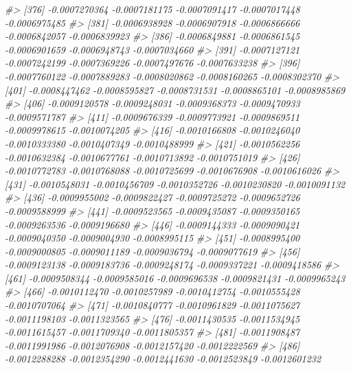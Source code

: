 \documentclass[
]{article}
\newenvironment{Shaded}{\begin{snugshade}}{\end{snugshade}}
\newcommand{\CommentTok}[1]{\textcolor[rgb]{0.56,0.35,0.01}{\textit{#1}}}
\begin{document}
\begin{Shaded}
\begin{Highlighting}[]
\CommentTok{\#\textgreater{} [376] {-}0.0007270364 {-}0.0007181175 {-}0.0007091417 {-}0.0007017448 {-}0.0006975485}
\CommentTok{\#\textgreater{} [381] {-}0.0006938928 {-}0.0006907918 {-}0.0006866666 {-}0.0006842057 {-}0.0006839923}
\CommentTok{\#\textgreater{} [386] {-}0.0006849881 {-}0.0006861545 {-}0.0006901659 {-}0.0006948743 {-}0.0007034660}
\CommentTok{\#\textgreater{} [391] {-}0.0007127121 {-}0.0007242199 {-}0.0007369226 {-}0.0007497676 {-}0.0007633238}
\CommentTok{\#\textgreater{} [396] {-}0.0007760122 {-}0.0007889283 {-}0.0008020862 {-}0.0008160265 {-}0.0008302370}
\CommentTok{\#\textgreater{} [401] {-}0.0008447462 {-}0.0008595827 {-}0.0008731531 {-}0.0008865101 {-}0.0008985869}
\CommentTok{\#\textgreater{} [406] {-}0.0009120578 {-}0.0009248031 {-}0.0009368373 {-}0.0009470933 {-}0.0009571787}
\CommentTok{\#\textgreater{} [411] {-}0.0009676339 {-}0.0009773921 {-}0.0009869511 {-}0.0009978615 {-}0.0010074205}
\CommentTok{\#\textgreater{} [416] {-}0.0010166808 {-}0.0010246040 {-}0.0010333380 {-}0.0010407349 {-}0.0010488999}
\CommentTok{\#\textgreater{} [421] {-}0.0010562256 {-}0.0010632384 {-}0.0010677761 {-}0.0010713892 {-}0.0010751019}
\CommentTok{\#\textgreater{} [426] {-}0.0010772783 {-}0.0010768088 {-}0.0010725699 {-}0.0010676908 {-}0.0010616026}
\CommentTok{\#\textgreater{} [431] {-}0.0010548031 {-}0.0010456709 {-}0.0010352726 {-}0.0010230820 {-}0.0010091132}
\CommentTok{\#\textgreater{} [436] {-}0.0009955002 {-}0.0009822427 {-}0.0009725272 {-}0.0009652726 {-}0.0009588999}
\CommentTok{\#\textgreater{} [441] {-}0.0009523565 {-}0.0009435087 {-}0.0009350165 {-}0.0009263536 {-}0.0009196680}
\CommentTok{\#\textgreater{} [446] {-}0.0009144333 {-}0.0009090421 {-}0.0009040350 {-}0.0009004930 {-}0.0008995115}
\CommentTok{\#\textgreater{} [451] {-}0.0008995400 {-}0.0009000805 {-}0.0009011189 {-}0.0009036794 {-}0.0009077619}
\CommentTok{\#\textgreater{} [456] {-}0.0009123138 {-}0.0009183736 {-}0.0009248174 {-}0.0009337221 {-}0.0009418586}
\CommentTok{\#\textgreater{} [461] {-}0.0009508344 {-}0.0009585016 {-}0.0009696538 {-}0.0009821431 {-}0.0009965243}
\CommentTok{\#\textgreater{} [466] {-}0.0010112470 {-}0.0010257989 {-}0.0010412754 {-}0.0010555428 {-}0.0010707064}
\CommentTok{\#\textgreater{} [471] {-}0.0010840777 {-}0.0010961829 {-}0.0011075627 {-}0.0011198103 {-}0.0011323565}
\CommentTok{\#\textgreater{} [476] {-}0.0011430535 {-}0.0011534945 {-}0.0011615457 {-}0.0011709340 {-}0.0011805357}
\CommentTok{\#\textgreater{} [481] {-}0.0011908487 {-}0.0011991986 {-}0.0012076908 {-}0.0012157420 {-}0.0012222569}
\CommentTok{\#\textgreater{} [486] {-}0.0012288288 {-}0.0012354290 {-}0.0012441630 {-}0.0012523849 {-}0.0012601232}

\end{Highlighting}
\end{Shaded}
\end{document}

